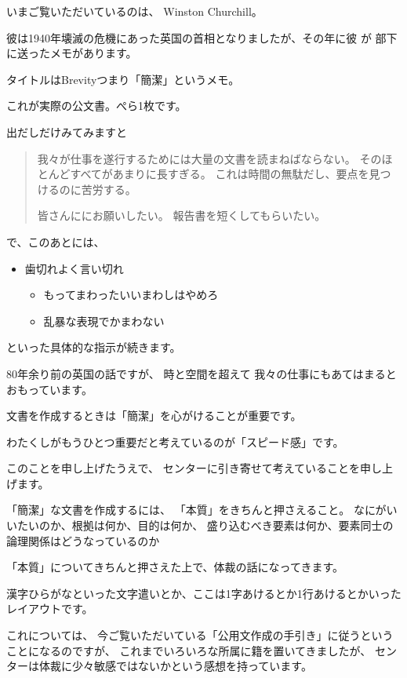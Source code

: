 \documentclass[uplatex,jis2004,dvipdfmx,12pt]{jsarticle}
\begin{document}
いまご覧いただいているのは、
Winston Churchill。

彼は1940年壊滅の危機にあった英国の首相となりましたが、その年に彼
が
部下に送ったメモがあります。

タイトルはBrevityつまり「簡潔」というメモ。

これが実際の公文書。ぺら1枚です。

出だしだけみてみますと

\begin{quote}
我々が仕事を遂行するためには大量の文書を読まねばならない。
そのほとんどすべてがあまりに長すぎる。
これは時間の無駄だし、要点を見つけるのに苦労する。

皆さんににお願いしたい。
報告書を短くしてもらいたい。
\end{quote}

で、このあとには、
\begin{itemize}
 \item 歯切れよく言い切れ
       \begin{itemize}
       \item もってまわったいいまわしはやめろ
       \item 乱暴な表現でかまわない
       \end{itemize}

\end{itemize}
といった具体的な指示が続きます。



80年余り前の英国の話ですが、
時と空間を超えて
我々の仕事にもあてはまるとおもっています。

文書を作成するときは「簡潔」を心がけることが重要です。

わたくしがもうひとつ重要だと考えているのが「スピード感」です。

このことを申し上げたうえで、
センターに引き寄せて考えていることを申し上げます。

「簡潔」な文書を作成するには、
「本質」をきちんと押さえること。
なにがいいたいのか、根拠は何か、目的は何か、
盛り込むべき要素は何か、要素同士の論理関係はどうなっているのか


「本質」についてきちんと押さえた上で、体裁の話になってきます。

漢字ひらがなといった文字遣いとか、ここは1字あけるとか1行あけるとかいったレイアウトです。

これについては、
今ご覧いただいている「公用文作成の手引き」に従うということになるのですが、
これまでいろいろな所属に籍を置いてきましたが、
センターは体裁に少々敏感ではないかという感想を持っています。
\end{document}
